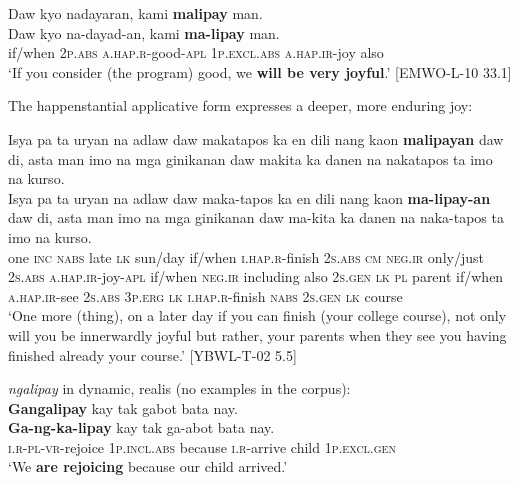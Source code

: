 \ea
\label{ex:veryjoyful}
Daw  kyo  nadayaran,  kami  \textbf{malipay}  man. \\\smallskip
\gll Daw  kyo  na-dayad-an,  kami  \textbf{ma-lipay}  man. \\
if/when  2\textsc{p.abs}  \textsc{a.hap.r}-good-\textsc{apl}  1\textsc{p.excl.abs}  \textsc{a.hap.ir}-joy  also \\
\glt ‘If you consider (the program) good, we \textbf{will be very joyful}.’ [EMWO-L-10 33.1]
\z

The happenstantial applicative form expresses a deeper, more enduring joy: 

\ea
\label{ex:yourparents}
Isya	pa	ta	uryan	na	adlaw	daw	makatapos	ka	en	dili nang	kaon	\textbf{malipayan}	daw	di,	asta	man	imo	na mga	ginikanan 	daw	makita	ka	danen	na	nakatapos ta	imo	na	kurso. \\\smallskip
\gll Isya	pa	ta	uryan	na	adlaw	daw	maka-tapos	ka	en	dili nang	kaon	\textbf{ma-lipay-an}	daw	di,	asta	man	imo	na mga	ginikanan 	daw	ma-kita	ka	danen	na	naka-tapos ta	imo	na	kurso. \\
one	\textsc{inc}	\textsc{nabs}	late	\textsc{lk}	sun/day	if/when	\textsc{i.hap.r}-finish	2\textsc{s.abs}	\textsc{cm}	\textsc{neg.ir} only/just	2\textsc{s.abs}	\textsc{a.hap.ir}-joy-\textsc{apl}	if/when	\textsc{neg.ir}	including	also	2\textsc{s.gen}	\textsc{lk} \textsc{pl}	parent	if/when	\textsc{a.hap.ir}-see	2\textsc{s.abs}	3\textsc{p.erg}	\textsc{lk}	\textsc{i.hap.r}-finish \textsc{nabs} 	2\textsc{s.gen}	\textsc{lk}	course \\
\glt ‘One more (thing), on a later day if you can finish (your college course), not only will you be innerwardly joyful but rather, your parents when they see you having finished already your course.’ [YBWL-T-02 5.5]
\z

\ea
\label{ex:childarrived}
\textit{ngalipay} in dynamic, realis (no examples in the corpus): \\
\textbf{Gangalipay}  kay  tak  gabot  bata  nay. \\\smallskip
\gll \textbf{Ga-ng-ka-lipay}  kay  tak  ga-abot  bata  nay. \\
\textsc{i.r-pl-vr}-rejoice  1\textsc{p.incl.abs}  because  \textsc{i.r}-arrive  child  1\textsc{p.excl.gen} \\
\glt ‘We \textbf{are rejoicing} because our child arrived.’
\z

